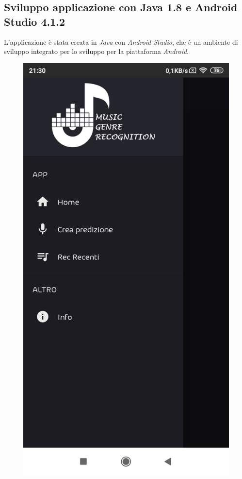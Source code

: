 \subsection{Sviluppo applicazione con Java 1.8 e Android Studio 4.1.2}
L'applicazione è stata creata in \textit{Java} con \textit{Android Studio}, che è un ambiente di sviluppo integrato per lo sviluppo per la piattaforma \textit{Android}.
\begin{figure}[H]
	\centering
	\includegraphics[scale=0.20]{./images/mobile01.jpg}

\end{figure}
